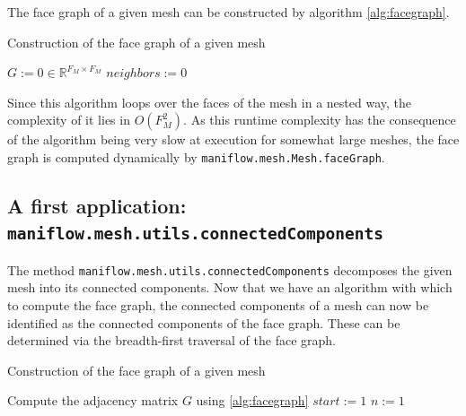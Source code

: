 \documentclass{article}
\newcommand{\R}{\mathbb{R}}
\begin{document}
The face graph of a given mesh can be constructed by algorithm \ref{alg:facegraph}.
\begin{algorithm}\label{alg:facegraph}

    \caption{Construction of the face graph of a given mesh}
    $G := 0\in\R^{F_M\times F_M}$\;
    {
        $neighbors := 0$\;
        {
        }
    }
\end{algorithm}
Since this algorithm loops over the faces of the mesh in a nested way, the complexity of it lies in $O(F_M^2)$. As this runtime complexity has the consequence of the algorithm being very slow at execution for somewhat large meshes, the face graph is computed dynamically by \texttt{maniflow.mesh.Mesh.faceGraph}.
\newpage
\subsection{A first application: \texttt{maniflow.mesh.utils.connectedComponents}}
The method \texttt{maniflow.mesh.utils.connectedComponents} decomposes the given mesh into its connected components. Now that we have an algorithm with which to compute the face graph, the connected components of a mesh can now be identified as the connected components of the face graph. These can be determined via the breadth-first traversal of the face graph. 
\begin{algorithm}\label{alg:components}

    \caption{Construction of the face graph of a given mesh}
    Compute the adjacency matrix $G$ using \ref{alg:facegraph}\;
    $start := 1$\;
    $n := 1$\;
    
\end{algorithm}
\end{document}
